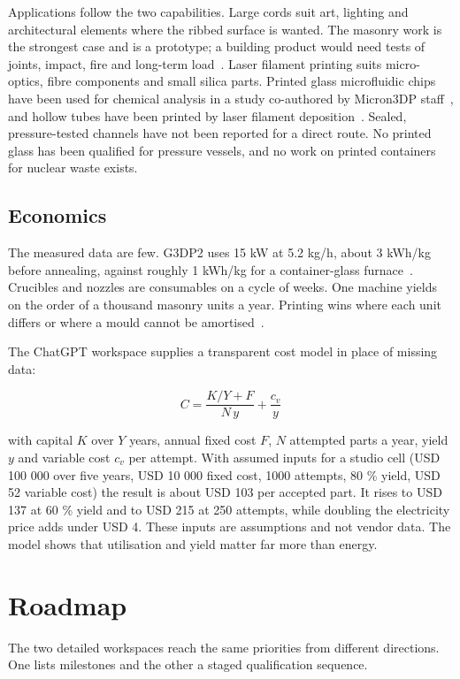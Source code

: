 \documentclass[10pt,a4paper]{article}
\begin{document}
Applications follow the two capabilities. Large cords suit art, lighting and architectural elements where the ribbed surface is wanted. The masonry work is the strongest case and is a prototype; a building product would need tests of joints, impact, fire and long-term load~\citep{mit2024masonry}. Laser filament printing suits micro-optics, fibre components and small silica parts. Printed glass microfluidic chips have been used for chemical analysis in a study co-authored by Micron3DP staff~\citep{microfluidics2019}, and hollow tubes have been printed by laser filament deposition~\citep{dgf2023tubes}. Sealed, pressure-tested channels have not been reported for a direct route. No printed glass has been qualified for pressure vessels, and no work on printed containers for nuclear waste exists.

\subsection{Economics}

The measured data are few. G3DP2 uses 15 kW at 5.2 kg/h, about 3 kWh/kg before annealing, against roughly 1 kWh/kg for a container-glass furnace~\citep{inamura2018}. Crucibles and nozzles are consumables on a cycle of weeks. One machine yields on the order of a thousand masonry units a year. Printing wins where each unit differs or where a mould cannot be amortised~\citep{mit2024masonry}.

The ChatGPT workspace supplies a transparent cost model in place of missing data:

\[ C = \frac{K/Y + F}{N\,y} + \frac{c_{v}}{y} \]

with capital $K$ over $Y$ years, annual fixed cost $F$, $N$ attempted parts a year, yield $y$ and variable cost $c_{v}$ per attempt. With assumed inputs for a studio cell (USD 100 000 over five years, USD 10 000 fixed cost, 1000 attempts, 80 \% yield, USD 52 variable cost) the result is about USD 103 per accepted part. It rises to USD 137 at 60 \% yield and to USD 215 at 250 attempts, while doubling the electricity price adds under USD 4. These inputs are assumptions and not vendor data. The model shows that utilisation and yield matter far more than energy.

\section{Roadmap}

The two detailed workspaces reach the same priorities from different directions. One lists milestones and the other a staged qualification sequence.
\end{document}
